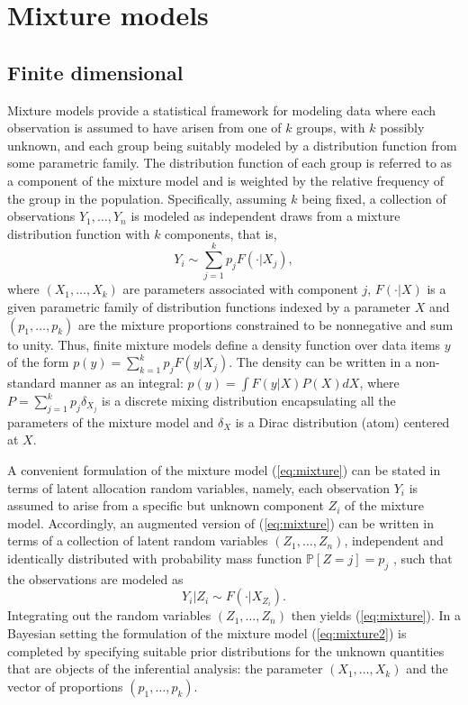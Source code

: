 \section{Mixture models}
\subsection{Finite dimensional}
Mixture models provide a statistical framework for modeling data where each observation is assumed to have arisen from one of $k$ groups, with $k$ possibly unknown, and each group being suitably modeled by a distribution function from some parametric family. The distribution function of each group is referred to as a component of the mixture model and is weighted by the relative frequency of the group in the population. Specifically, assuming $k$ being fixed, a collection of observations $Y_1,\dots,Y_n$ is modeled as independent draws from a mixture distribution function with $k$ components, that is,
\begin{equation} \label{eq:mixture}
Y_i \sim \sum_{j=1}^k{p_j F(\cdot|X_j)},
\end{equation}
where $(X_1,\dots,X_k)$ are parameters associated with component $j$, $F(\cdot|X)$ is a given parametric family of distribution functions indexed by a parameter $X$ and
$(p_1, \dots, p_k)$ are the mixture proportions constrained to be nonnegative and sum to unity.
Thus, finite mixture models define a density function over data items $y$ of the form $p(y) = \sum_{k=1}^k p_j F(y|X_j)$. The density can be written in a non-standard manner as an integral: $p(y) = \int F(y|X) P(X)dX$, where $P = \sum_{j=1}^k p_j \delta_{X_j}$ is a discrete mixing distribution encapsulating all the parameters of the mixture model and $\delta_{X}$ is a Dirac distribution (atom) centered at $X$.

A convenient formulation of the mixture model (\ref{eq:mixture}) can be stated in terms of latent allocation random variables, namely, each observation $Y_i$ is assumed to arise from a specific but unknown component $Z_i$ of the mixture model. Accordingly, an augmented version of (\ref{eq:mixture}) can be written in terms of a collection of latent random variables $(Z_1, \dots , Z_n)$, independent and identically distributed with probability mass function $\mathbb{P}[Z = j] = p_j$ , such that the observations are modeled as
\begin{equation} \label{eq:mixture2}
Y_i|Z_i \sim F(\cdot|X_{Z_i}).
\end{equation}
Integrating out the random variables $(Z_1, \dots , Z_n)$ then yields (\ref{eq:mixture}). In a Bayesian setting the formulation of the mixture model (\ref{eq:mixture2}) is completed by specifying suitable prior distributions for the unknown quantities that are objects of the inferential analysis: the parameter $(X_1, \dots, X_k)$ and the vector of proportions $(p_1, \dots, p_k)$.

